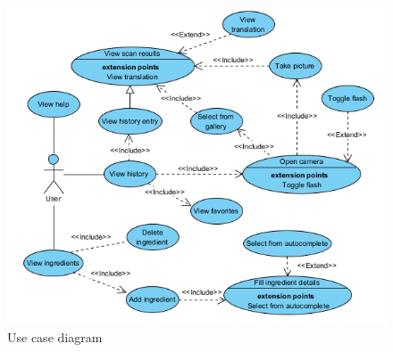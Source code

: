 \begin{figure}[h]
  \centering
  \includegraphics[width=\textwidth]{Figures/use_case_diagram.png}
  \caption{%
    Use case diagram
  }
  \label{fig:use-case-diagram}
\end{figure}

